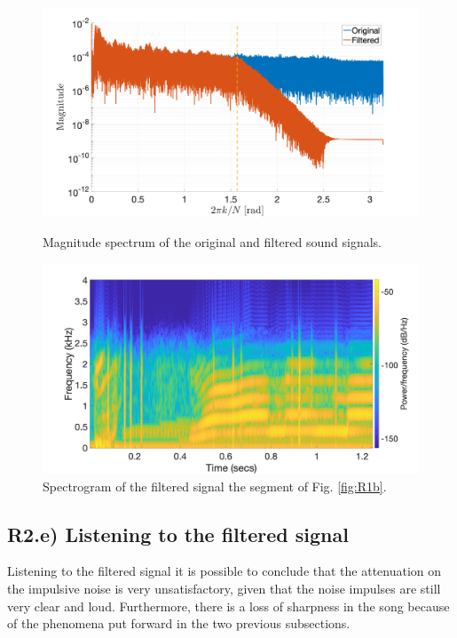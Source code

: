 \documentclass[a4paper, oneside, 11pt]{article}
\begin{document}
\begin{figure}[htbp]
	\centering
	\begin{minipage}[b]{.49\textwidth}
		\centering
		\includegraphics[width= 1.1\textwidth]{figures/R2d.png}
		\caption{Magnitude spectrum of the original and filtered sound signals.}
		\label{fig:R2d}
	\end{minipage}
	\hfill
	\begin{minipage}[b]{.49\textwidth}
		\centering
		\includegraphics[width= 1.1\textwidth]{figures/R2d_spectrogram.png}
		\caption{Spectrogram of the filtered signal the segment of Fig. \ref{fig:R1b}.}
		\label{fig:Red_spectrogram}
	\end{minipage}
\end{figure}

\subsection{R2.e) Listening to the filtered signal}
Listening to the filtered signal it is possible to conclude that the attenuation on the impulsive noise is very unsatisfactory, given that the noise impulses are still very clear and loud. Furthermore, there is a loss of sharpness in the song because of the phenomena put forward in the two previous subsections.
\end{document}
